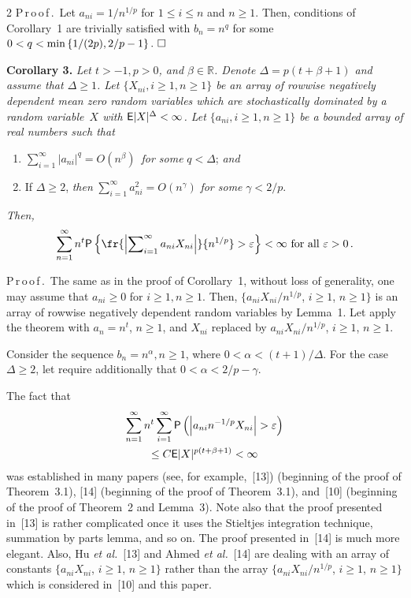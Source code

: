 \begin{multicols}{2}
\noindent 
P\,r\,o\,o\,f\,.\ Let $a_{ni}=1/n^{1/p}$ for $1\le i\le n$ and $n\ge 1.$ 
Then, conditions of Corollary~1 are
trivially satisfied with $b_n= n^q$ for some $0<q <\min\left\{{1}/({2p}), {2}/{p}-1\right\}.\hfill~\Box$

\medskip

\noindent 
\textbf{Corollary 3.} \textit{Let $t>-1, p>0$, and $\beta \in {\mathbb R}$. Denote $\Delta=p(t+\beta+1)$ and
assume that $\Delta\ge 1$. Let $\{X_{ni}, i\ge 1, n\ge 1\}$ be an array of rowwise negatively dependent  mean
zero random variables which are stochastically dominated by a random variable~$X$ with 
${\sf E}|X|^{\Delta}<\infty$.
Let $\{a_{ni}, i\ge 1, n\ge 1\}$ be a bounded array of real numbers such that}
\begin{enumerate}[(1)]
\item  $ \sum\limits_{i=1}^\infty |a_{ni}|^q =O(n^\beta)$\ \textit{for some} $q< \Delta$; \textit{and}
\item  If $\Delta \ge 2$, \textit{then} $\sum\limits_{i=1}^\infty a_{ni}^2=O(n^\gamma )$
\textit{for some} $\gamma<2/p$.
\end{enumerate}
\textit{Then,}
$$ 
\sum\limits_{n=1}^\infty n^t {\sf P}\left\{ 
\fr{\left|\sum\nolimits_{i=1}^\infty a_{ni}X_{ni}\right|}{n^{1/p}}>\varepsilon \right\}
<\infty \mbox{ for all } \varepsilon>0\,.
$$

\noindent 
P\,r\,o\,o\,f\,.\ The same as in the proof of Corollary~1, without loss of generality, 
one may assume that
$a_{ni}\ge 0$ for $i\ge 1, n\ge 1.$ Then, $\{a_{ni}X_{ni}/n^{1/p}$, $i\ge 1$, $n\ge 1\}$ 
is an array of rowwise
negatively dependent random variables by Lemma~1. 
Let apply the theorem with $a_n=n^t$, $n\ge 1$, and $X_{ni}$
replaced by $a_{ni}X_{ni}/n^{1/p}$, $i\ge 1$, $n\ge 1$.

Consider the sequence $b_n=n^{\alpha}, n\ge 1$, 
where $0<\alpha <(t+1)/\Delta$. For the case $\Delta\ge 2$,
let require additionally that $0<\alpha< 2/p - \gamma$.

The fact that
\begin{multline*}
\sum\limits_{n=1}^\infty n^t \sum\limits_{i=1}^\infty 
{\sf P}\left( \left\vert a_{ni}n^{-1/p} X_{ni}\right\vert>
\varepsilon\right)\\
\le C{\sf E}|X|^{p(t+\beta+1)}
< \infty 
\end{multline*}
was established in many papers (see, for example,~[13]) 
(beginning of the proof of Theorem~3.1),
[14] (beginning of the proof of Theorem~3.1), and~[10] 
(beginning of the proof of Theorem~2 and Lemma~3). 
Note also  that the proof presented in~[13] is rather complicated
once it uses the Stieltjes integration technique, summation by parts lemma, and so on. 
The proof presented in~[14] is much more elegant. Also, Hu {\it et al.}~[13] and 
Ahmed {\it et al.}~[14] 
are dealing with an array of constants $\{ a_{ni}X_{ni}$, $i\ge 1$, $n\ge 1\}$ rather 
than the array $\{a_{ni}X_{ni}/n^{1/p}$, $i\ge 1$, $n\ge 1\}$ which is considered in~[10] 
and this paper.


\end{multicols}
